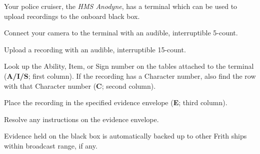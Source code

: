 \documentclass[green]{guildcamp4}
\begin{document}
Your police cruiser, the \emph{HMS Anodyne}, has a terminal which can be used to upload recordings to the onboard black box.

\begin{enum}
	\item Connect your camera to the terminal with an audible, interruptible 5-count.
    \item Upload a recording with an audible, interruptible 15-count.
    \item Look up the Ability, Item, or Sign number on the tables attached to the terminal ({\bf A/I/S}; first column). If the recording has a Character number, also find the row with that Character number ({\bf C}; second column).
    \item Place the recording in the specified evidence envelope ({\bf E}; third column).
    \item Resolve any instructions on the evidence envelope.
\end{enum}

\begin{itemz}[Notes]
	\item Evidence held on the black box is automatically backed up to other Frith ships within broadcast range, if any.
\end{itemz}
\end{document}
